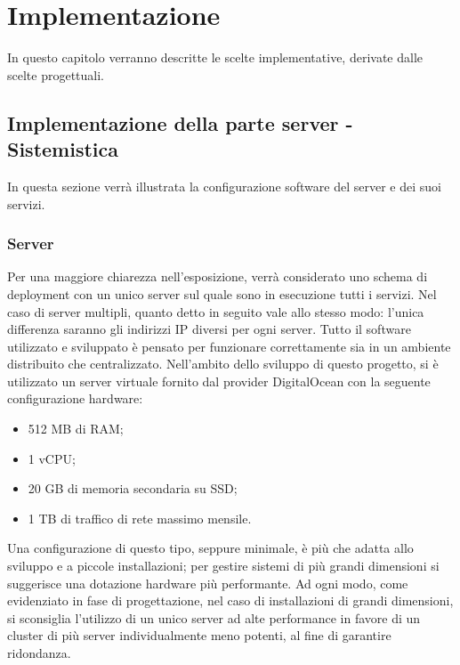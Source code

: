 \chapter{Implementazione}

In questo capitolo verranno descritte le scelte implementative, derivate dalle scelte progettuali.

\section{Implementazione della parte server - Sistemistica}
In questa sezione verrà illustrata la configurazione software del server e dei suoi servizi.

\subsection{Server}
Per una maggiore chiarezza nell'esposizione, verrà considerato uno schema di deployment con un unico server sul quale sono in esecuzione tutti i servizi.
Nel caso di server multipli, quanto detto in seguito vale allo stesso modo: l'unica differenza saranno gli indirizzi IP diversi per ogni server.
Tutto il software utilizzato e sviluppato è pensato per funzionare correttamente sia in un ambiente distribuito che centralizzato.
Nell'ambito dello sviluppo di questo progetto, si è utilizzato un server virtuale fornito dal provider DigitalOcean con la seguente configurazione hardware:
\begin{itemize}
 \item 512 MB di RAM;
 \item 1 vCPU;
 \item 20 GB di memoria secondaria su SSD;
 \item 1 TB di traffico di rete massimo mensile.
\end{itemize}
Una configurazione di questo tipo, seppure minimale, è più che adatta allo sviluppo e a piccole installazioni; per gestire sistemi di più grandi dimensioni si suggerisce una dotazione hardware più performante.
Ad ogni modo, come evidenziato in fase di progettazione, nel caso di installazioni di grandi dimensioni, si sconsiglia l'utilizzo di un unico server ad alte performance in favore di un cluster di più server individualmente meno potenti, al fine di garantire ridondanza.

